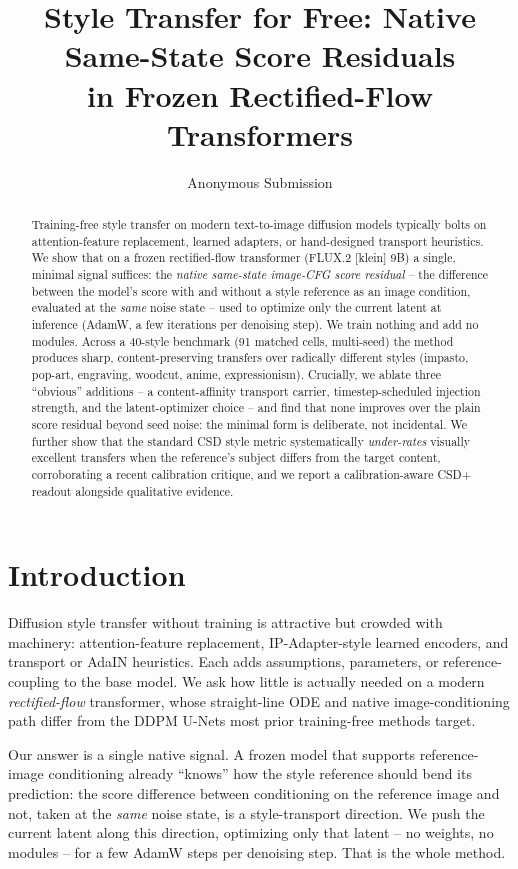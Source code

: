 \documentclass[letterpaper]{article} %
\title{Style Transfer for Free: Native Same-State Score Residuals\\ in Frozen Rectified-Flow Transformers}
\author{
    Anonymous Submission
}
\begin{document}
\maketitle

\begin{abstract}
Training-free style transfer on modern text-to-image diffusion models typically
bolts on attention-feature replacement, learned adapters, or hand-designed
transport heuristics. We show that on a frozen rectified-flow transformer
(FLUX.2 [klein] 9B) a single, minimal signal suffices: the \emph{native
same-state image-CFG score residual} -- the difference between the model's
score with and without a style reference as an image condition, evaluated at
the \emph{same} noise state -- used to optimize only the current latent at
inference (AdamW, a few iterations per denoising step). We train nothing and
add no modules. Across a 40-style benchmark (91 matched cells, multi-seed) the
method produces sharp, content-preserving transfers over radically different
styles (impasto, pop-art, engraving, woodcut, anime, expressionism). Crucially,
we ablate three ``obvious'' additions -- a content-affinity transport carrier,
timestep-scheduled injection strength, and the latent-optimizer choice -- and
find that none improves over the plain score residual beyond seed noise: the
minimal form is deliberate, not incidental. We further show that the standard
CSD style metric systematically \emph{under-rates} visually excellent transfers
when the reference's subject differs from the target content, corroborating a
recent calibration critique, and we report a calibration-aware CSD+ readout
alongside qualitative evidence.
\end{abstract}

\section{Introduction}

Diffusion style transfer without training is attractive but crowded with
machinery: attention-feature replacement, IP-Adapter-style learned encoders,
and transport or AdaIN heuristics. Each adds assumptions, parameters, or
reference-coupling to the base model. We ask how little is actually needed
on a modern \emph{rectified-flow} transformer, whose straight-line ODE and
native image-conditioning path differ from the DDPM U-Nets most prior
training-free methods target.

Our answer is a single native signal. A frozen model that supports
reference-image conditioning already ``knows'' how the style reference should
bend its prediction: the score difference between conditioning on the
reference image and not, taken at the \emph{same} noise state, is a
style-transport direction. We push the current latent along this direction,
optimizing only that latent -- no weights, no modules -- for a few AdamW steps
per denoising step. That is the whole method.
\end{document}
